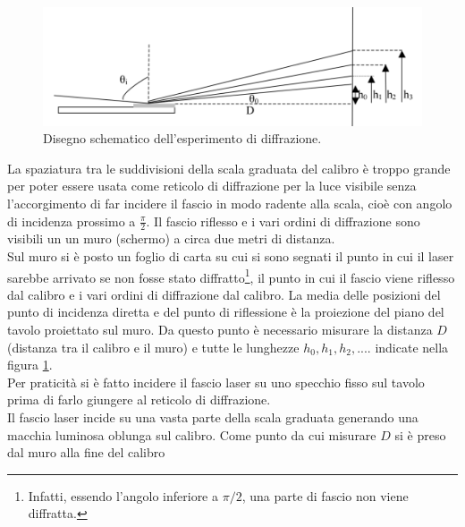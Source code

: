 \documentclass[10pt,a4paper]{article}
\begin{document}
\begin{figure}[!htb]
  \centering
  \includegraphics[scale=.5]{disegno1.png}
\caption{Disegno schematico dell'esperimento di diffrazione.}
\label{parteAfigura}

\end{figure}
La spaziatura tra le suddivisioni della scala graduata del calibro è troppo grande per poter essere usata come reticolo di diffrazione per la luce visibile senza l'accorgimento di far incidere il fascio in modo radente alla scala, cioè con angolo di incidenza prossimo a $\frac{\pi}{2}$. Il fascio riflesso e i vari ordini di diffrazione sono visibili un un muro (schermo) a circa due metri di distanza.\\
Sul muro si è posto un foglio di carta su cui si sono segnati il punto in cui il laser sarebbe arrivato se non fosse stato diffratto\footnote{Infatti, essendo l'angolo inferiore a $\pi /2$, una parte di fascio non viene diffratta.}, il punto in cui il fascio viene riflesso dal calibro e i vari ordini di diffrazione dal calibro. La media delle posizioni del punto di incidenza diretta e del punto di riflessione è la proiezione del piano del tavolo proiettato sul muro. Da questo punto è necessario misurare la distanza $D$ (distanza tra il calibro e il muro) e tutte le lunghezze $h_0, h_1, h_2,...$. indicate nella figura \ref{parteAfigura}.\\
Per praticità si è fatto incidere il fascio laser su uno specchio fisso sul tavolo prima di farlo giungere al reticolo di diffrazione.\\ 
Il fascio laser incide su una vasta parte della scala graduata generando una macchia luminosa oblunga sul calibro. Come punto da cui misurare $D$ si è preso dal muro alla fine del calibro\\

\end{document}
